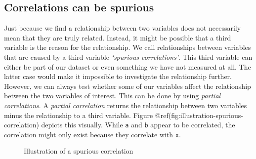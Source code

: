\documentclass[
  letterpaper,
]{krantz}
\begin{document}
\subsection{Correlations can be
spurious}\label{sec-correlations-can-be-spurious}

Just because we find a relationship between two variables does not
necessarily mean that they are truly related. Instead, it might be
possible that a third variable is the reason for the relationship. We
call relationships between variables that are caused by a third variable
\emph{`spurious correlations'}. This third variable can either be part
of our dataset or even something we have not measured at all. The latter
case would make it impossible to investigate the relationship further.
However, we can always test whether some of our variables affect the
relationship between the two variables of interest. This can be done by
using \emph{partial correlations}. A \emph{partial correlation} returns
the relationship between two variables minus the relationship to a third
variable. Figure @ref(fig:illustration-spurious-correlation) depicts
this visually. While \texttt{a} and \texttt{b} appear to be correlated,
the correlation might only exist because they correlate with \texttt{x}.

\begin{figure}


\caption{\label{fig-illustration-spurious-correlation}Illustration of a
spurious correlation}

\end{figure}%
\end{document}
